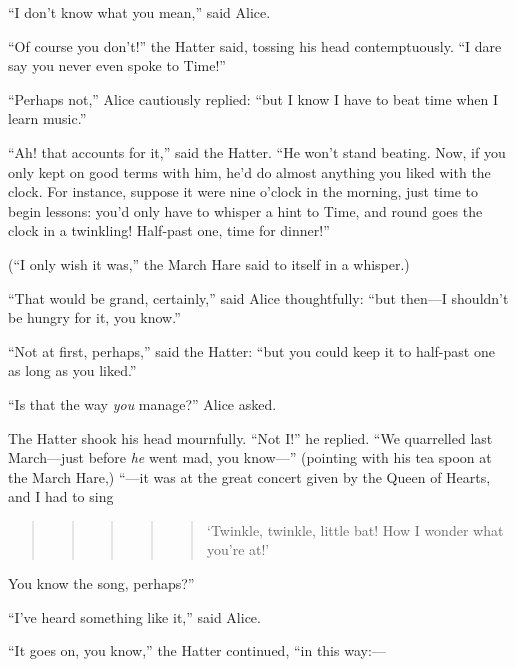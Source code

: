 \documentclass[11pt,openany,oneside]{book}
\begin{document}
“I don’t know what you mean,” said Alice. 

“Of course you don’t!” the Hatter said, tossing his head contemptuously. “I dare say you never even spoke to Time!” 

“Perhaps not,” Alice cautiously replied: “but I know I have to beat time when I learn music.” 

“Ah! that accounts for it,” said the Hatter. “He won’t stand beating. Now, if you only kept on good terms with him, he’d do almost anything you liked with the clock. For instance, suppose it were nine o’clock in the morning, just time to begin lessons: you’d only have to whisper a hint to Time, and round goes the clock in a twinkling! Half-past one, time for dinner!” 

(“I only wish it was,” the March Hare said to itself in a whisper.) 

“That would be grand, certainly,” said Alice thoughtfully: “but then—I shouldn’t be hungry for it, you know.” 

“Not at first, perhaps,” said the Hatter: “but you could keep it to half-past one as long as you liked.” 

“Is that the way {\em you\/} manage?” Alice asked. 

The Hatter shook his head mournfully. “Not I!” he replied. “We quarrelled last March—just before {\em he\/} went mad, you know—” (pointing with his tea spoon at the March Hare,) “—it was at the great concert given by the Queen of Hearts, and I had to sing 

\begin{quote}
\begin{quote}
\begin{quote}
\begin{quote}
\begin{quote}
{\small ‘Twinkle, twinkle, little bat!}\newline
{\small  How I wonder what you’re at!’ }

\end{quote}
\end{quote}
\end{quote}
\end{quote}
\end{quote}
You know the song, perhaps?” 

“I’ve heard something like it,” said Alice. 

“It goes on, you know,” the Hatter continued, “in this way:— 
\end{document}
